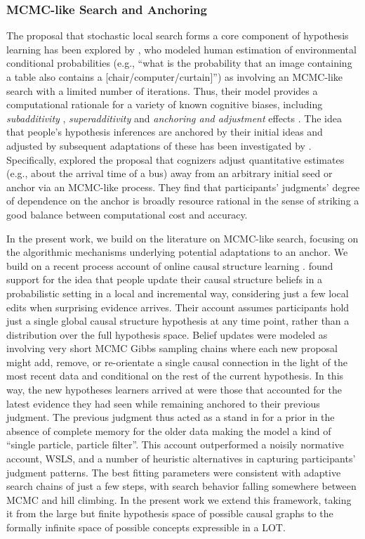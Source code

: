 \documentclass[doc,natbib,floatsintext]{apa7}
\begin{document}
\subsubsection{MCMC-like Search and Anchoring}
The proposal that stochastic local search forms a core component of hypothesis learning has been explored by \cite{dasgupta2017hypotheses}, who modeled human estimation of environmental conditional probabilities (e.g., ``what is the probability that an image containing a table also contains a [chair/computer/curtain]'') as involving an MCMC-like search with a limited number of iterations. Thus, their model provides a computational rationale for a variety of known cognitive biases, including \textit{subadditivity} \citep{fox1998belief}, \textit{superadditivity} \citep{sloman2004typical} and \textit{anchoring and adjustment} effects \citep{hogarth1992order}. The idea that people's hypothesis inferences are anchored by their initial ideas and adjusted by subsequent adaptations of these has been investigated by \cite{lieder2018anchoring}. Specifically, \cite{lieder2018anchoring} explored the proposal that cognizers adjust quantitative estimates (e.g., about the arrival time of a bus) away from an arbitrary initial seed or anchor via an MCMC-like process. They find that participants' judgments' degree of dependence on the anchor is broadly resource rational in the sense of striking a good balance between computational cost and accuracy. 

In the present work, we build on the literature on MCMC-like search, focusing on the algorithmic mechanisms underlying potential adaptations to an anchor. We build on a recent process account of online causal structure learning \citep{bramley2017formalizing}. \cite{bramley2017formalizing} found support for the idea that people update their causal structure beliefs in a probabilistic setting in a local and incremental way, considering just a few local edits when surprising evidence arrives. Their account assumes participants hold just a single global causal structure hypothesis at any time point, rather than a distribution over the full hypothesis space. Belief updates were modeled as involving very short MCMC Gibbs sampling chains where each new proposal might add, remove, or re-orientate a single causal connection in the light of the most recent data and conditional on the rest of the current hypothesis. In this way, the new hypotheses learners arrived at were those that accounted for the latest evidence they had seen while remaining anchored to their previous judgment. The previous judgment thus acted as a stand in for a prior in the absence of complete memory for the older data making the model a kind of ``single particle, particle filter''. This account outperformed a noisily normative account, WSLS, and a number of heuristic alternatives in capturing participants' judgment patterns. The best fitting parameters were consistent with adaptive search chains of just a few steps, with search behavior falling somewhere between MCMC and hill climbing. In the present work we extend this framework, taking it from the large but finite hypothesis space of possible causal graphs to the formally infinite space of possible concepts expressible in a LOT.  
\end{document}
